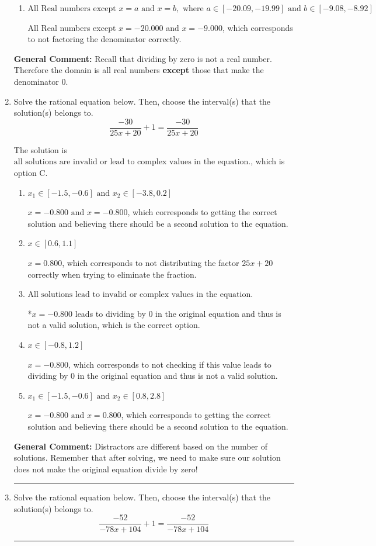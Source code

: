 \documentclass{extbook}[14pt]
\newcommand{\litem}[1]{\item #1

\rule{\textwidth}{0.4pt}}
\begin{document}
\begin{enumerate}
{\begin{enumerate}[label=\Alph*.]
This corresponds to thinking the denominator has complex roots or that rational functions have a domain of all Real numbers.
\item \( \text{All Real numbers except } x = a \text{ and } x = b, \text{ where } a \in [-20.09, -19.99] \text{ and } b \in [-9.08, -8.92] \)

All Real numbers except $x = -20.000$ and $x = -9.000$, which corresponds to not factoring the denominator correctly.
\end{enumerate}

\textbf{General Comment:} Recall that dividing by zero is not a real number. Therefore the domain is all real numbers \textbf{except} those that make the denominator 0.
}
\litem{
Solve the rational equation below. Then, choose the interval(s) that the solution(s) belongs to.
\[ \frac{-30}{25x + 20} + 1 = \frac{-30}{25x + 20} \]

The solution is \( \text{all solutions are invalid or lead to complex values in the equation.} \), which is option C.\begin{enumerate}[label=\Alph*.]
\item \( x_1 \in [-1.5, -0.6] \text{ and } x_2 \in [-3.8,0.2] \)

$x = -0.800 \text{ and } x = -0.800$, which corresponds to getting the correct solution and believing there should be a second solution to the equation.
\item \( x \in [0.6,1.1] \)

$x = 0.800$, which corresponds to not distributing the factor $25x + 20$ correctly when trying to eliminate the fraction.
\item \( \text{All solutions lead to invalid or complex values in the equation.} \)

*$x = -0.800$ leads to dividing by 0 in the original equation and thus is not a valid solution, which is the correct option.
\item \( x \in [-0.8,1.2] \)

$x = -0.800$, which corresponds to not checking if this value leads to dividing by 0 in the original equation and thus is not a valid solution.
\item \( x_1 \in [-1.5, -0.6] \text{ and } x_2 \in [0.8,2.8] \)

$x = -0.800 \text{ and } x = 0.800$, which corresponds to getting the correct solution and believing there should be a second solution to the equation.
\end{enumerate}

\textbf{General Comment:} Distractors are different based on the number of solutions. Remember that after solving, we need to make sure our solution does not make the original equation divide by zero!
}
\litem{
Solve the rational equation below. Then, choose the interval(s) that the solution(s) belongs to.
\[ \frac{-52}{-78x + 104} + 1 = \frac{-52}{-78x + 104} \]

}
\end{enumerate}
\end{document}
